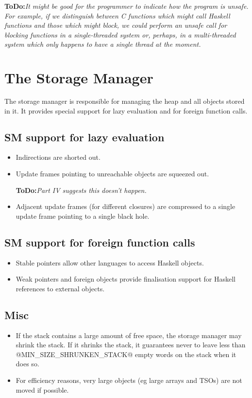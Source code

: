 \documentclass[11pt]{article}
\newcommand{\ToDo}[1]{{{\bf ToDo:}\sl #1}}
\newcommand{\Section}[2]{\section{#1}\label{sec:#2}}
\newcommand{\Subsection}[2]{\subsection{#1}\label{sec:#2}}
\begin{document}
\ToDo{It might be good for the programmer to indicate how the program
is unsafe.  For example, if we distinguish between C functions which
might call Haskell functions and those which might block, we could
perform an unsafe call for blocking functions in a single-threaded
system or, perhaps, in a multi-threaded system which only happens to
have a single thread at the moment.}



\Section{The Storage Manager}{sm-overview}

The storage manager is responsible for managing the heap and all
objects stored in it.  It provides special support for lazy evaluation
and for foreign function calls.

\Subsection{SM support for lazy evaluation}{sm-lazy-evaluation}

\begin{itemize}
\item

Indirections are shorted out.

\item

Update frames pointing to unreachable objects are squeezed out.

\ToDo{Part IV suggests this doesn't happen.}

\item

Adjacent update frames (for different closures) are compressed to a
single update frame pointing to a single black hole.

\end{itemize}


\Subsection{SM support for foreign function calls}{sm-foreign-calls}

\begin{itemize}

\item

Stable pointers allow other languages to access Haskell objects.

\item

Weak pointers and foreign objects provide finalisation support for
Haskell references to external objects.

\end{itemize}

\Subsection{Misc}{sm-misc}

\begin{itemize}

\item

If the stack contains a large amount of free space, the storage
manager may shrink the stack.  If it shrinks the stack, it guarantees
never to leave less than @MIN_SIZE_SHRUNKEN_STACK@ empty words on the
stack when it does so.

\item

For efficiency reasons, very large objects (eg large arrays and TSOs)
are not moved if possible.

\end{itemize}
\end{document}
